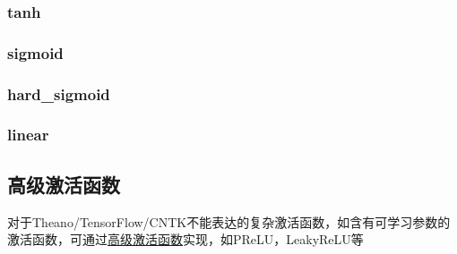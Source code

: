 \subsubsection{tanh}\label{tanh}

\begin{Shaded}
\begin{Highlighting}[]
\end{Highlighting}
\end{Shaded}



\subsubsection{sigmoid}\label{sigmoid}

\begin{Shaded}
\begin{Highlighting}[]
\end{Highlighting}
\end{Shaded}



\subsubsection{hard\_sigmoid}\label{hardux5fsigmoid}

\begin{Shaded}
\begin{Highlighting}[]
\end{Highlighting}
\end{Shaded}



\subsubsection{linear}\label{linear}

\begin{Shaded}
\begin{Highlighting}[]
\end{Highlighting}
\end{Shaded}

\subsection{高级激活函数}\label{ux9ad8ux7ea7ux6fc0ux6d3bux51fdux6570}

对于Theano/TensorFlow/CNTK不能表达的复杂激活函数，如含有可学习参数的激活函数，可通过\hyperref[advanced-activations]{高级激活函数}实现，如PReLU，LeakyReLU等
\newpage